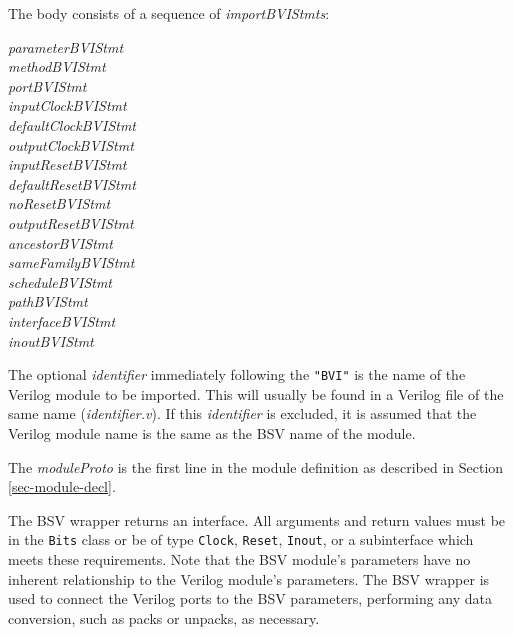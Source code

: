 \documentclass[twoside,letterpaper]{article}
\newcommand{\hm}{\hspace*{1em}}
\newcommand{\V}{Verilog}
\newcommand{\te}[1]{\texttt{#1}}
\newcommand{\nterm}[1]{\emph{#1}}
\newcommand{\term}[1]{\texttt{#1}}
\newcommand{\alt}{{$\mid$}}
\newcommand{\gram}[2]{    \hm\makebox[10em][l]{\it #1}\makebox[1.5em][l]{::=}    #2}
\newcommand{\gramalt}[1]{ \hm\makebox[10em][l]{      }\makebox[1.5em][l]{\alt}   #1}
\begin{document}
The body consists of a sequence of \nterm{importBVIStmts}:

\gram{importBVIStmt} { \nterm{parameterBVIStmt}} \\
\gramalt             { \nterm{methodBVIStmt} } \\
\gramalt             { \nterm{portBVIStmt}} \\
\gramalt             { \nterm{inputClockBVIStmt}}   \\
\gramalt             { \nterm{defaultClockBVIStmt}} \\
\gramalt             { \nterm{outputClockBVIStmt}}   \\
\gramalt             { \nterm{inputResetBVIStmt}}  \\
\gramalt             { \nterm{defaultResetBVIStmt}}   \\
\gramalt             { \nterm{noResetBVIStmt}}  \\
\gramalt             { \nterm{outputResetBVIStmt} } \\
\gramalt             { \nterm{ancestorBVIStmt}  } \\
\gramalt             { \nterm{sameFamilyBVIStmt}  } \\
\gramalt             { \nterm{scheduleBVIStmt} } \\
\gramalt             { \nterm{pathBVIStmt} } \\
\gramalt             { \nterm{interfaceBVIStmt}}\\
\gramalt             { \nterm{inoutBVIStmt} } 


The optional \nterm{identifier} immediately following the \term{"BVI"} is the name of the {\V} module to be
imported. This will usually be found in a Verilog file of the same
name (\emph{identifier.v}).  If this \nterm{identifier}
is excluded, it is assumed that the {\V} module name is the same as
the BSV name of the module.

The \nterm{moduleProto} is the first line in the module
definition as described in Section \ref{sec-module-decl}. 


The BSV wrapper returns an
interface.  All arguments and return values must be in the \te{Bits}
class or be of type \te{Clock},
\te{Reset}, \te{Inout},  or a subinterface which meets these requirements.  Note
that the  BSV
module's parameters have no inherent relationship to the Verilog module's
parameters.  The BSV wrapper is used to connect the Verilog ports to
the BSV parameters, performing any data conversion, such as packs or
unpacks, as necessary. 
\end{document}
